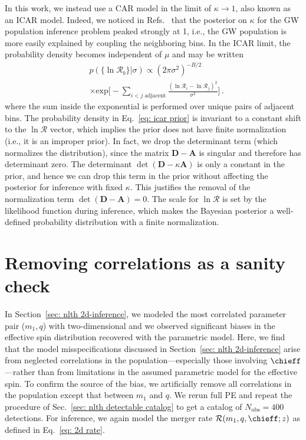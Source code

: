 \begin{refsection}
\begin{subappendices}
In this work, we instead use a \ac{CAR} model in the limit of $\kappa \to 1$, also known as an \ac{ICAR} model. Indeed, we noticed in Refs.~\citep{Heinzel:2024hva,Heinzel:2024jlc} that the posterior on $\kappa$ for the \ac{GW} population inference problem peaked strongly at 1, i.e., the \ac{GW} population is more easily explained by coupling the neighboring bins. In the \ac{ICAR} limit, the probability density becomes independent of $\mu$ and may be written
\begin{align}
& p ( \{ \ln\mathcal{R}_b \} | \sigma )
\propto
(2\pi \sigma^2 )^{-B/2}
\nonumber \\
& \times
\mathrm{exp}
\bigg[
- \sum_{i<j \; \textrm{adjacent}}
\frac{(\ln\mathcal{R}_i -\ln\mathcal{R}_j)^2}{\sigma^2}
\bigg]
\, .
\label{eq: icar prior}    
\end{align}
where the sum inside the exponential is performed over unique pairs of adjacent bins. The probability density in Eq.~\eqref{eq: icar prior} is invariant to a constant shift to the $\ln\boldsymbol{\mathcal{R}}$ vector, which implies the prior does not have finite normalization (i.e., it is an improper prior). In fact, we drop the determinant term (which normalizes the distribution), since the matrix $\mathbf{D}-\mathbf{A}$ is singular and therefore has determinant zero. The determinant $\det(\mathbf{D} - \kappa\mathbf{A})$ is only a constant in the prior, and hence we can drop this term in the prior without affecting the \PixelPop posterior for inference with fixed $\kappa$. This justifies the removal of the normalization term $\det(\mathbf{D} - \mathbf{A}) = 0$. The scale for $\ln\boldsymbol{\mathcal{R}}$ is set by the likelihood function during inference, which makes the Bayesian posterior a well-defined probability distribution with a finite normalization.


\section{Removing correlations as a sanity check}
\label{sec: nlth appUncorrPop}

In Section~\ref{sec: nlth 2d-inference}, we modeled the most correlated parameter pair ($m_1,q$) with two-dimensional \PixelPop and we observed significant biases in the effective spin distribution recovered with the \PeakTukey parametric model. Here, we find that the model misspecifications discussed in Section~\ref{sec: nlth 2d-inference} arise from neglected correlations in the population---especially those involving $\chieff$---rather than from limitations in the assumed parametric model for the effective spin. To confirm the source of the bias, we artificially remove all correlations in the population except that between $m_1$ and $q$. We rerun full \ac{PE} and repeat the procedure of Sec.~\ref{sec: nlth detectable catalog} to get a catalog of $N_\mathrm{obs} = 400$ detections. For inference, we again model the merger rate $\mathcal{R}(m_1,q,\chieff;z)$ as defined in Eq.~\eqref{eq: 2d rate}. 


\end{subappendices}
\end{refsection}
